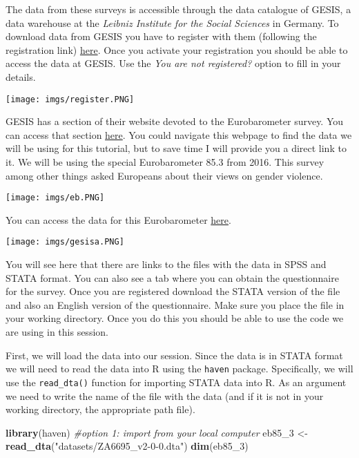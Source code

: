 \documentclass[
]{book}
\newenvironment{Shaded}{\begin{snugshade}}{\end{snugshade}}
\newcommand{\CommentTok}[1]{\textcolor[rgb]{0.56,0.35,0.01}{\textit{#1}}}
\newcommand{\FunctionTok}[1]{\textcolor[rgb]{0.13,0.29,0.53}{\textbf{#1}}}
\newcommand{\NormalTok}[1]{#1}
\newcommand{\OtherTok}[1]{\textcolor[rgb]{0.56,0.35,0.01}{#1}}
\newcommand{\StringTok}[1]{\textcolor[rgb]{0.31,0.60,0.02}{#1}}
\begin{document}
The data from these surveys is accessible through the data catalogue of GESIS, a data warehouse at the \emph{Leibniz Institute for the Social Sciences} in Germany. To download data from GESIS you have to register with them (following the registration link) \href{https://login.gesis.org/realms/gesis/protocol/openid-connect/auth?client_id=gesis-gws-client&redirect_uri=https\%3A\%2F\%2Fsearch.gesis.org\%2Fresearch_data&response_mode=fragment&response_type=code&scope=openid&ui_locales=en}{here}. Once you activate your registration you should be able to access the data at GESIS. Use the \emph{You are not registered?} option to fill in your details.

\texttt{[image: imgs/register.PNG]}

GESIS has a section of their website devoted to the Eurobarometer survey. You can access that section \href{https://www.gesis.org/eurobarometer-data-service/home/}{here}. You could navigate this webpage to find the data we will be using for this tutorial, but to save time I will provide you a direct link to it. We will be using the special Eurobarometer 85.3 from 2016. This survey among other things asked Europeans about their views on gender violence.

\texttt{[image: imgs/eb.PNG]}

You can access the data for this Eurobarometer \href{https://search.gesis.org/research_data/ZA6695}{here}.

\texttt{[image: imgs/gesisa.PNG]}

You will see here that there are links to the files with the data in SPSS and STATA format. You can also see a tab where you can obtain the questionnaire for the survey. Once you are registered download the STATA version of the file and also an English version of the questionnaire. Make sure you place the file in your working directory. Once you do this you should be able to use the code we are using in this session.

First, we will load the data into our session. Since the data is in STATA format we will need to read the data into R using the \texttt{haven} package. Specifically, we will use the \texttt{read\_dta()} function for importing STATA data into R. As an argument we need to write the name of the file with the data (and if it is not in your working directory, the appropriate path file).

\begin{Shaded}
\begin{Highlighting}[]
\FunctionTok{library}\NormalTok{(haven)}
\CommentTok{\#option 1: import from your local computer}
\NormalTok{eb85\_3 }\OtherTok{\textless{}{-}} \FunctionTok{read\_dta}\NormalTok{(}\StringTok{"datasets/ZA6695\_v2{-}0{-}0.dta"}\NormalTok{)}
\FunctionTok{dim}\NormalTok{(eb85\_3)}
\end{Highlighting}
\end{Shaded}
\end{document}
